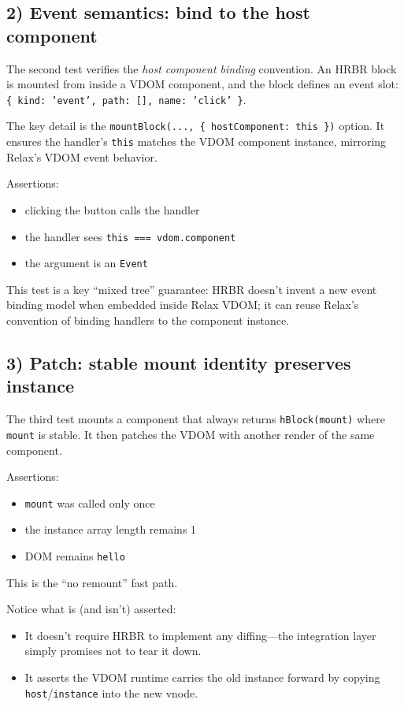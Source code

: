 \subsection{2) Event semantics: bind to the host component}

The second test verifies the \emph{host component binding} convention.
An HRBR block is mounted from inside a VDOM component, and the block defines an event slot:\\
\texttt{\{ kind: 'event', path: [], name: 'click' \}}.

The key detail is the \texttt{mountBlock(..., \{ hostComponent: this \})} option.
It ensures the handler's \texttt{this} matches the VDOM component instance, mirroring Relax's VDOM event behavior.

Assertions:

\begin{itemize}
\item clicking the button calls the handler
\item the handler sees \texttt{this === vdom.component}
\item the argument is an \texttt{Event}
\end{itemize}

This test is a key ``mixed tree'' guarantee: HRBR doesn't invent a new event binding model when embedded inside Relax VDOM; it can reuse Relax's convention of binding handlers to the component instance.

\subsection{3) Patch: stable mount identity preserves instance}

The third test mounts a component that always returns \texttt{hBlock(mount)} where \texttt{mount} is stable.
It then patches the VDOM with another render of the same component.

Assertions:

\begin{itemize}
\item \texttt{mount} was called only once
\item the instance array length remains 1
\item DOM remains \texttt{hello}
\end{itemize}

This is the ``no remount'' fast path.

Notice what is (and isn't) asserted:

\begin{itemize}
\item It doesn't require HRBR to implement any diffing---the integration layer simply promises not to tear it down.
\item It asserts the VDOM runtime carries the old instance forward by copying \texttt{host}/\texttt{instance} into the new vnode.
\end{itemize}

